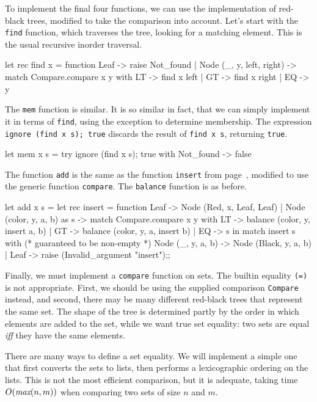 To implement the final four functions, we can use the implementation
of red-black trees, modified to take the comparison into account.
Let's start with the \hbox{\lstinline$find$} function, which traverses
the tree, looking for a matching element.  This is the usual recursive
inorder traversal.

\begin{ocaml}
let rec find x = function
   Leaf -> raise Not_found
 | Node (_, y, left, right) ->
      match Compare.compare x y with
         LT -> find x left
       | GT -> find x right
       | EQ -> y
\end{ocaml}
%
The \hbox{\lstinline$mem$} function is similar.  It is so similar in
fact, that we can simply implement it in terms
of \hbox{\lstinline$find$}, using the exception to determine
membership.  The expression
%
\hbox{\lstinline$ignore (find x s); true$}
%
discards the result of \hbox{\lstinline$find x s$}, returning \hbox{\lstinline$true$}.

\begin{ocaml}
let mem x s =
   try ignore (find x s); true with
      Not_found -> false
\end{ocaml}
%
The function \hbox{\lstinline$add$} is the same as
the function \hbox{\lstinline$insert$} from
page~\pageref{page:red-black-insert}, modified to use the generic
function \hbox{\lstinline$compare$}.  The \hbox{\lstinline$balance$}
function is as before.

\begin{ocaml}
let add x s =
   let rec insert = function
      Leaf -> Node (Red, x, Leaf, Leaf)
    | Node (color, y, a, b) as s ->
         match Compare.compare x y with
            LT -> balance (color, y, insert a, b)
          | GT -> balance (color, y, a, insert b)
          | EQ -> s
   in
      match insert s with  (* guaranteed to be non-empty *)
         Node (_, y, a, b) -> Node (Black, y, a, b)
       | Leaf -> raise (Invalid_argument "insert");;
\end{ocaml}
%
Finally, we must implement a \hbox{\lstinline$compare$} function on
sets.  The builtin equality \hbox{\lstinline$(=)$} is not appropriate.
First, we should be using the supplied
comparison \hbox{\lstinline$Compare$} instead, and second, there may
be many different red-black trees that represent the same set.  The
shape of the tree is determined partly by the order in which elements
are added to the set, while we want true set equality: two sets are
equal \emph{iff} they have the same elements.

There are many ways to define a set equality.  We will implement a
simple one that first converts the sets to lists, then performs a
lexicographic ordering on the lists.  This is not the most efficient
comparison, but it is adequate, taking time $O(\textit{max}(n, m))$ when
comparing two sets of size $n$ and $m$.

